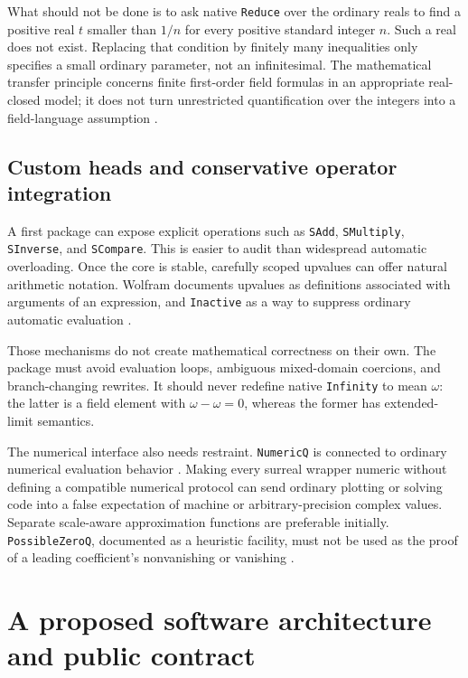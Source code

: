 \documentclass[11pt,letterpaper]{article}
\numberwithin{equation}{section}
\theoremstyle{definition}
\theoremstyle{remark}\newtheorem{remark}[theorem]{Remark}
\begin{document}
What should not be done is to ask native \texttt{Reduce} over the ordinary
reals to find a positive real $t$ smaller than $1/n$ for every positive
standard integer $n$. Such a real does not exist. Replacing that condition by
finitely many inequalities only specifies a small ordinary parameter, not
an infinitesimal. The mathematical transfer principle concerns finite
first-order field formulas in an appropriate real-closed model; it does not
turn unrestricted quantification over the integers into a field-language
assumption \cite{SourcePolynomial,PerrucciRoy}.

\subsection{Custom heads and conservative operator integration}
A first package can expose explicit operations such as
\texttt{SAdd}, \texttt{SMultiply}, \texttt{SInverse}, and
\texttt{SCompare}. This is easier to audit than widespread automatic
overloading. Once the core is stable, carefully scoped upvalues can offer
natural arithmetic notation. Wolfram documents upvalues as definitions
associated with arguments of an expression, and \texttt{Inactive} as a way
to suppress ordinary automatic evaluation \cite{WLUpValues,WLInactive}.

Those mechanisms do not create mathematical correctness on their own.
The package must avoid evaluation loops, ambiguous mixed-domain coercions,
and branch-changing rewrites. It should never redefine native
\texttt{Infinity} to mean $\omega$: the latter is a field element with
$\omega-\omega=0$, whereas the former has extended-limit semantics.

The numerical interface also needs restraint. \texttt{NumericQ} is connected
to ordinary numerical evaluation behavior \cite{WLNumericQ}. Making every
surreal wrapper numeric without defining a compatible numerical protocol can
send ordinary plotting or solving code into a false expectation of machine
or arbitrary-precision complex values. Separate scale-aware approximation
functions are preferable initially. \texttt{PossibleZeroQ}, documented as a
heuristic facility, must not be used as the proof of a leading coefficient's
nonvanishing or vanishing \cite{WLPossibleZeroQ}.

\section{A proposed software architecture and public contract}
\label{sec:architecture}
\end{document}
